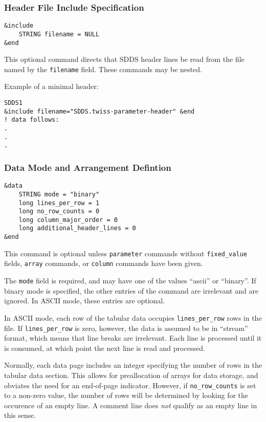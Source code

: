 \documentclass[11pt]{article}
\begin{document}
\subsubsection{Header File Include Specification}
\begin{verbatim}
&include
    STRING filename = NULL
&end
\end{verbatim}

This optional command directs that SDDS header lines be read from the file named by the {\tt filename} field.  These commands may be nested.

Example of a minimal header:
\begin{verbatim}
SDDS1
&include filename="SDDS.twiss-parameter-header" &end
! data follows:
.
.
.
\end{verbatim}

\subsubsection{Data Mode and Arrangement Defintion}
\begin{verbatim}
&data
    STRING mode = "binary"
    long lines_per_row = 1
    long no_row_counts = 0
    long column_major_order = 0
    long additional_header_lines = 0
&end
\end{verbatim}

This command is optional unless {\tt parameter} commands without {\tt fixed\_value} fields, {\tt array} commands, or {\tt column} commands have been given.

The {\tt mode} field is required, and may have one of the values ``ascii'' or ``binary''.  If binary mode is specified, the other entries of the command are irrelevant and are ignored.  In ASCII mode, these entries are optional.

In ASCII mode, each row of the tabular data occupies {\tt lines\_per\_row} rows in the file.  If {\tt lines\_per\_row} is zero, however, the data is assumed to be in ``stream'' format, which means that line breaks are irrelevant. Each line is processed until it is consumed, at which point the next line is read and processed.

Normally, each data page includes an integer specifying the number of rows in the tabular data section.  This allows for preallocation of arrays for data storage, and obviates the need for an end-of-page indicator.  However, if {\tt no\_row\_counts} is set to a non-zero value, the number of rows will be determined by looking for the occurence of an empty line.  A comment line does {\em not} qualify as an empty line in this sense.
\end{document}
